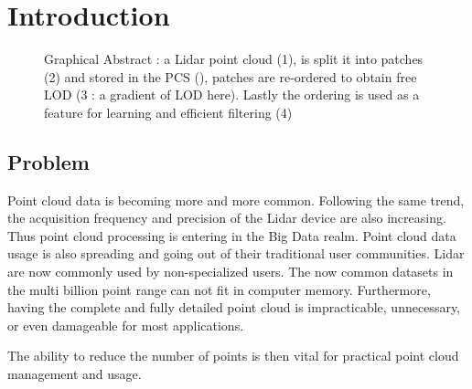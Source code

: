 

\section{Introduction}

\begin{figure}[t!]
	\begin{center}
		\caption{Graphical Abstract : a Lidar point cloud (1), is split it into patches (2) 
		and stored in the PCS (\cite{Cura2015}), patches are re-ordered to obtain free LOD 
		(3 : a gradient of LOD here).
		Lastly the ordering is used as a feature for learning and efficient filtering (4) } 
		\label{lod.fig:banner_image}
	\end{center}
\end{figure} 

\subsection{Problem}  
	Point cloud data is becoming more and more common. Following the same trend, the acquisition frequency and precision of the Lidar device are also increasing.
	Thus point cloud processing is entering in the Big Data realm.
	Point cloud data usage is also spreading and going out of their traditional user communities. 
	Lidar are now commonly used by non-specialized users. 
	The now common datasets in the multi billion point range can not fit in computer memory. 
	Furthermore, having the complete and fully detailed point cloud is impracticable, unnecessary, or even damageable for most applications.
	
	The ability to reduce the number of points is then vital for practical point cloud management and usage.
 
